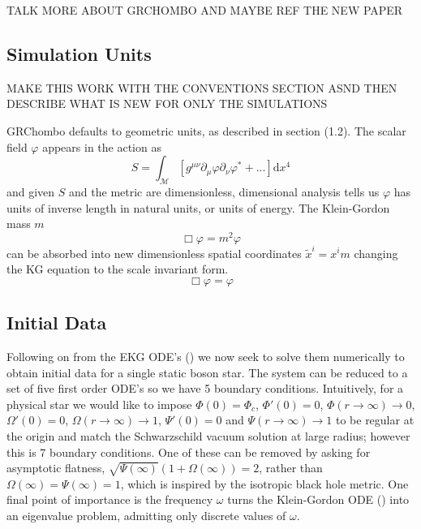 \documentclass[11pt, oneside]{report}  %
\newcommand{\M}{\mathcal{M}}
\newcommand{\vp}{\varphi}
\newcommand{\dd}{\mathrm{d}}
\numberwithin{equation}{section}
\begin{document}
TALK MORE ABOUT GRCHOMBO AND MAYBE REF THE NEW PAPER


\subsection{Simulation Units}
MAKE THIS WORK WITH THE CONVENTIONS SECTION ASND THEN DESCRIBE WHAT IS NEW FOR ONLY THE SIMULATIONS

GRChombo defaults to geometric units, as described in section (1.2). The scalar field $\vp$ appears in the action as
\begin{equation} S = \int_{\M} \left[g^{\mu\nu}\partial_\mu \vp \partial_\nu \vp^* + ... \right]\dd x^4\end{equation}
and given $S$ and the metric are dimensionless, dimensional analysis tells us $\vp$ has units of inverse length in natural units, or units of energy. The Klein-Gordon mass $m$
\begin{equation} \Box \vp = m^2 \vp\end{equation}
can be absorbed into new dimensionless spatial coordinates $\tilde{x}^i = x^i m$ changing the KG equation to the scale invariant form.
\begin{equation} \Box \vp = \vp\end{equation}



\subsection{Initial Data}
Following on from the EKG ODE's () we now seek to solve them numerically to obtain initial data for a single static boson star. The system can be reduced to a set of five first order ODE's so we have 5 boundary conditions. Intuitively, for a physical star we would like to impose $\Phi(0) = \Phi_c$, $\Phi'(0)=0$, $\Phi(r\rightarrow\infty)\rightarrow0$, $\Omega'(0)=0$, $\Omega(r\rightarrow\infty)\rightarrow1$, $\Psi'(0)=0$ and $\Psi(r\rightarrow\infty)\rightarrow1$ to be regular at the origin and match the Schwarzschild vacuum solution at large radius; however this is 7 boundary conditions. One of these can be removed by asking for asymptotic flatness, $\sqrt{\Psi(\infty)}\left(1+\Omega(\infty)\right)=2$, rather than $\Omega(\infty)=\Psi(\infty)=1$, which is inspired by the isotropic black hole metric. One final point of importance is the frequency $\omega$ turns the Klein-Gordon ODE () into an eigenvalue problem, admitting only discrete values of $\omega$.
\end{document}
